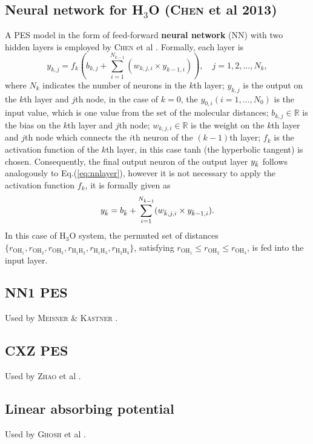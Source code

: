 \documentclass[12pt]{article}
\begin{document}
\subsection{Neural network for H$_3$O (\textsc{Chen} et al 2013)}
A PES model in the form of feed-forward \textbf{neural network} (NN) with two hidden layers is employed by \textsc{Chen} et al \cite{idx60}. Formally, each layer is
\begin{equation}
    y_{k,j} = f_k\left(b_{k,j} + \sum^{N_{k-1}}_{i=1}(w_{k,j,i} \times y_{k-1,i})\right), \quad j=1,2,...,N_k,
    \label{eq:nnlayer}
\end{equation}
where $N_k$ indicates the number of neurons in the $k$th layer; $y_{k,j}$ is the output on the $k$th layer and $j$th node, in the case of $k=0$, the $y_{0,i} (i=1,...,N_{0})$ is the input value, which is one value from the set of the molecular distances; $b_{k,j} \in \mathbb{R}$ is the bias on the $k$th layer and $j$th node; $w_{k,j,i} \in \mathbb{R}$ is the weight on the $k$th layer and $j$th node which connects the $i$th neuron of the $(k-1)$th layer; $f_k$ is the activation function of the $k$th layer, in this case tanh (the hyperbolic tangent) is chosen.
Consequently, the final output neuron of the output layer $y_{\Bar{k}}$ follows analogously to Eq.(\ref{eq:nnlayer}), however it is not necessary to apply the activation function $f_k$, it is formally given as
\begin{equation}
    y_{\Bar{k}} = b_{\Bar{k}} +  \sum^{N_{\Bar{k}-1}}_{i=1} (w_{\Bar{k},j,i} \times y_{\Bar{k}-1,i}).
    \label{eq:nnoutput}
\end{equation}
In this case of H$_3$O system, the permuted set of distances $\{r_{\text{OH}_1}, r_{\text{OH}_2}, r_{\text{OH}_3}, r_{{\text{H}_1} {\text{H}_2}}, r_{{\text{H}_1} {\text{H}_3}}, r_{{\text{H}_2} {\text{H}_3}} \}$, satisfying $r_{\text{OH}_1} \leq r_{\text{OH}_2} \leq r_{\text{OH}_3}$, is fed into the input layer. 



\subsection{NN1 PES}
Used by \textsc{Meisner \& Kästner} \cite{idx106}.

\subsection{CXZ PES}
Used by \textsc{Zhao} et al \cite{idx107}.

\subsection{Linear absorbing potential}
Used by \textsc{Ghosh} et al \cite{idx152}.
\end{document}
